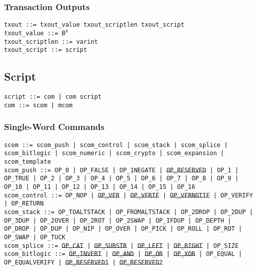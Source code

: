 \documentclass{article}
\begin{document}
\subsubsection{Transaction Outputs}
\noindent
\texttt{txout ::= txout\_value txout\_scriptlen txout\_script  } \\
\texttt{txout\_value ::= B$^8$} \\
\texttt{txout\_scriptlen ::= varint} \\
\texttt{txout\_script ::= script}

\subsection{Script}
\noindent
\texttt{script ::= com | com script} \\
\texttt{com ::= scom | mcom}

\subsubsection{Single-Word Commands}
\noindent \hangindent=0.7cm
\texttt{scom ::=
  scom\_push | scom\_control | scom\_stack | scom\_splice | scom\_bitlogic |
  scom\_numeric | scom\_crypto | scom\_expansion | scom\_template} \\

\noindent \hangindent=0.7cm
\texttt{scom\_push ::=
  OP\_0 | OP\_FALSE | OP\_1NEGATE | \sout{OP\_RESERVED} | OP\_1 | OP\_TRUE |
  OP\_2 | OP\_3 | OP\_4 | OP\_5 | OP\_6 | OP\_7 | OP\_8 | OP\_9 | OP\_10 |
  OP\_11 | OP\_12 | OP\_13 | OP\_14 | OP\_15 | OP\_16} \\

\noindent \hangindent=0.7cm
\texttt{scom\_control ::=
 OP\_NOP | \sout{OP\_VER} | \sout{OP\_VERIF} | \sout{OP\_VERNOTIF} | OP\_VERIFY
 | OP\_RETURN} \\

\noindent \hangindent=0.7cm
\texttt{scom\_stack ::=
  OP\_TOALTSTACK | OP\_FROMALTSTACK | OP\_2DROP | OP\_2DUP | OP\_3DUP |
  OP\_2OVER | OP\_2ROT | OP\_2SWAP | OP\_IFDUP | OP\_DEPTH | OP\_DROP | OP\_DUP
  | OP\_NIP | OP\_OVER | OP\_PICK | OP\_ROLL | OP\_ROT | OP\_SWAP | OP\_TUCK}
  \\

\noindent \hangindent=0.7cm
\texttt{scom\_splice ::=
  \sout{OP\_CAT }| \sout{OP\_SUBSTR} | \sout{OP\_LEFT} | \sout{OP\_RIGHT} |
  OP\_SIZE} \\

\noindent \hangindent=0.7cm
\texttt{scom\_bitlogic ::=
  \sout{OP\_INVERT} | \sout{OP\_AND} | \sout{OP\_OR} | \sout{OP\_XOR} |
  OP\_EQUAL | OP\_EQUALVERIFY | \sout{OP\_RESERVED1} | \sout{OP\_RESERVED2}} \\
\end{document}
